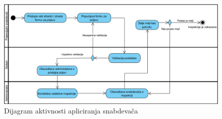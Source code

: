 \begin{figure}[H]
\begin{center}
\includegraphics[width=\textwidth]{Pictures/activity_supplier_application.png}
\end{center}
    \caption{Dijagram aktivnosti apliciranja snabdevača}
\label{fig:ActivitySupplierApplication}
\end{figure}
